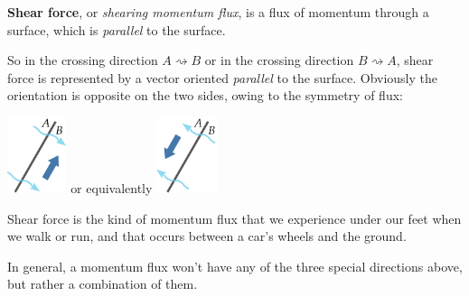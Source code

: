 \documentclass[a4paper,12pt,%
onecolumn,oneside,%
british%
]{memoir}
\providecommand{\href}[2]{#2}
\renewcommand*{\|}[1][]{\nonscript\:#1\vert\nonscript\:\mathopen{}}
\newcommand*{\furl}[2]{\href{#1}{#2}\pagenote{\url{#1}}}
\begin{document}
\textbf{Shear force}, or \emph{shearing momentum flux}, is a flux of momentum through a surface, which is \emph{parallel} to the surface.

So in the crossing direction $A\!\rightsquigarrow\!B$ or in the crossing direction $B\!\rightsquigarrow\!A$, shear force is represented by a vector oriented \emph{parallel} to the surface. Obviously the orientation is opposite on the two sides, owing to the symmetry of flux:\noprelistbreak
\begin{center}\medskip
  \hspace*{\fill}
  \includegraphics[align=c,height=6em]{images/shearforce_right.pdf}
  \hfill{\small or equivalently}\hfill
  \includegraphics[align=c,height=6em]{images/shearforce_left.pdf}
  \hspace*{\fill}
\end{center}

Shear force is the kind of momentum flux that we experience under our feet when we walk or run, and that occurs between a car's wheels and the ground.

\bigskip

In general, a momentum flux won't have any of the three special directions above, but rather a combination of them.
\end{document}
